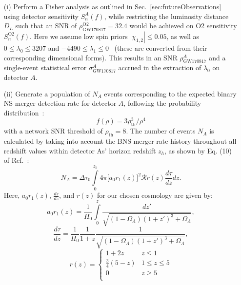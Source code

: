 \documentclass[prd,twocolumn,nofootinbib,superscriptaddress,amsmath,amssymb]{revtex4-1}
\begin{document}
\begin{enumerate}
\item[(i)] Perform a Fisher analysis as outlined in Sec.~\ref{sec:futureObservations} using detector sensitivity $S_n^A(f)$, while restricting the luminosity distance $D_L$ such that an SNR of $\rho^{\text{O2}}_{\text{GW170817}}=32.4$ would be achieved on O2 sensitivity $S_n^{\text{O2}}(f)$.
Here we assume low spin priors $|\chi_{1,2}| \leq 0.05$, as well as $0 \leq \lambda_0 \leq 3207$ and $-4490 \leq \lambda_1 \leq 0$~\cite{delPozzo:TaylorTidal} (these are converted from their corresponding dimensional forms).
This results in an SNR $\rho^A_{\text{GW170817}}$ and a single-event statistical error $\sigma_\text{GW170817}^A$ accrued in the extraction of $\lambda_0$ on detector $A$.

\item[(ii)] Generate a population of $N_A$ events corresponding to the expected binary NS merger detection rate for detector $A$, following the probability distribution~\cite{Shutz:SNR,Chen:SNR}:
\begin{equation}\label{eq:population}
f(\rho)=3 \rho_{\text{th}}^3/\rho^4
\end{equation}
with a network SNR threshold of $\rho_{\text{th}}=8$.
The number of events $N_A$ is calculated by taking into account the BNS merger rate history throughout all redshift values within detector As' horizon redshift $z_h$, as shown by Eq. (10) of Ref.~\cite{Cutler:BNSmerger}:
\begin{equation}
N_A=\Delta \tau_0 \int\limits^{z_{h}}_0 4 \pi \lbrack  a_0r_1(z)\rbrack^2 \mathcal{R} r(z) \frac{d \tau}{dz} dz.
\end{equation}
Here, $a_0r_1(z)$, $\frac{d\tau}{dz}$, and $r(z)$ for our chosen cosmology are given by:
\begin{equation}
a_0r_1(z) = \frac{1}{H_0}\int\limits^z_0 \frac{dz'}{\sqrt{(1-\Omega_{\Lambda})(1+z')^3+\Omega_{\Lambda}}},
\end{equation}
\begin{equation}
\frac{d\tau}{dz} = \frac{1}{H_0} \frac{1}{1+z}\frac{1}{\sqrt{(1-\Omega_{\Lambda})(1+z')^3+\Omega_{\Lambda}}},
\end{equation}
\begin{equation}
r(z) = \left\{
\begin{array}{ll}
      1+2z & z \leq 1 \\
      \frac{3}{4}(5-z) & 1\leq z\leq 5 \\
      0 & z\geq 5\\ 
\end{array} 
\right.
\end{equation}


\end{enumerate}
\end{document}

